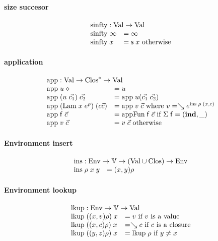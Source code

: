 \paragraph*{size succesor}

\[
\begin{array}[t]{ll}
\multicolumn{2}{l}{\sinfty : \Val \ra \Val}\\ 
\sinfty \; \infty & = \infty\\
\sinfty \;  x & = \s x  \mbox{ otherwise}\\ 
\end{array}
\]
\paragraph*{application}
\[
\begin{array}{ll}
\multicolumn{2}{l}{\ap : \Val \ra \ves{\Clos} \ra \Val}\\
\ap \; u \; \diamond & = u \\
\ap \; (u \; \vec{c_1}) \; \vec{c_2} & = \ap \; u (\vec{c_1}\;\vec{c_2})\\
\ap \; (\vlam \; x \; \cl{e}{\rho}) \; (c \vec{c}) & = \ap \; v \; \vec{c} \mbox{ where } v = \wh \cl{e}{\ins \; \rho \; (x,c)} \\ 
\ap \; \ff \; \vec{c} & = \apf \; \ff \; \vec{c} \mbox{ if } \Sig \; \ff = (\ind,\_) \\
\ap \; v \; \vec{c} & = v \; \vec{c} \mbox{ otherwise } \\
\end{array}
\]

\paragraph*{Environment insert}  
\[
\begin{array}{ll}
\multicolumn{2}{l}{\ins : \Env \ra \cV \ra ( \Val \cup \Clos ) \ra \Env}\\
\ins \; \rho \; x \; y & = (x,y) \rho
\end{array}
\]

\paragraph*{Environment lookup}
\[
\begin{array}{ll}
\multicolumn{2}{l}{\lkup : \Env \ra \cV \ra \Val }\\
\lkup \; ((x,v) \rho) \; x & = v \mbox{ if } v \mbox{ is a value} \\
\lkup \; ((x,c) \rho) \; x & = \wh c \mbox{ if } c \mbox{ is a closure} \\
\lkup \; ((y,z) \rho) \; x & = \lkup \; \rho \mbox{ if } y \neq x  
\end{array}
\]

